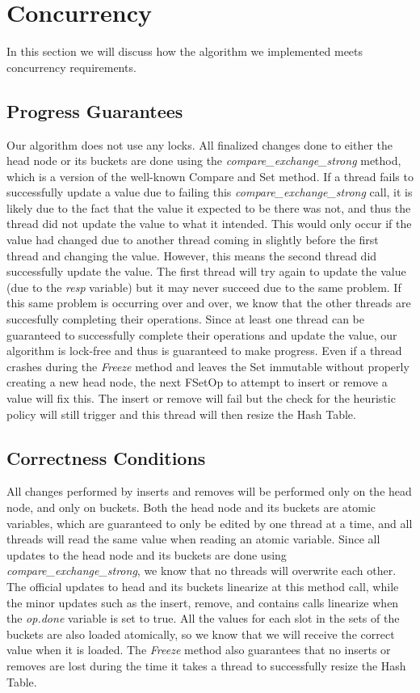 \documentclass[11pt]{article} %
\begin{document}
\section{Concurrency}

In this section we will discuss how the algorithm we implemented meets concurrency requirements.

\subsection{Progress Guarantees}

Our algorithm does not use any locks. All finalized changes done to either the head node or its buckets are done using the \textit{compare\_exchange\_strong} method, which is a version of the well-known Compare and Set method. If a thread fails to successfully update a value due to failing this \textit{compare\_exchange\_strong} call, it is likely due to the fact that the value it expected to be there was not, and thus the thread did not update the value to what it intended. This would only occur if the value had changed due to another thread coming in slightly before the first thread and changing the value. However, this means the second thread did successfully update the value. The first thread will try again to update the value (due to the \textit{resp} variable) but it may never succeed due to the same problem. If this same problem is occurring over and over, we know that the other threads are succesfully completing their operations. Since at least one thread can be guaranteed to successfully complete their operations and update the value, our algorithm is lock-free and thus is guaranteed to make progress. Even if a thread crashes during the \textit{Freeze} method and leaves the Set immutable without properly creating a new head node, the next FSetOp to attempt to insert or remove a value will fix this. The insert or remove will fail but the check for the heuristic policy will still trigger and this thread will then resize the Hash Table.

\subsection{Correctness Conditions}

All changes performed by inserts and removes will be performed only on the head node, and only on buckets. Both the head node and its buckets are atomic variables, which are guaranteed to only be edited by one thread at a time, and all threads will read the same value when reading an atomic variable. Since all updates to the head node and its buckets are done using  \textit{compare\_exchange\_strong}, we know that no threads will overwrite each other. The official updates to head and its buckets linearize at this method call, while the minor updates such as the insert, remove, and contains calls linearize when the \textit{op.done} variable is set to true. All the values for each slot in the sets of the buckets are also loaded atomically, so we know that we will receive the correct value when it is loaded. The \textit{Freeze} method also guarantees that no inserts or removes are lost during the time it takes a thread to successfully resize the Hash Table.
\end{document}
